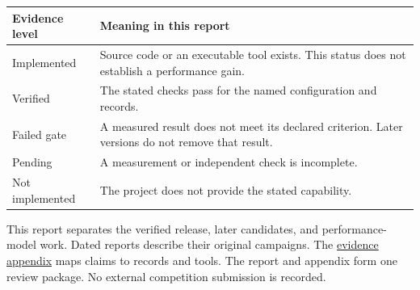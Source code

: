 \documentclass[10pt,a4paper]{article}
\begin{document}
\begin{longtable}[]{@{}ll@{}}
\toprule
\begin{minipage}[b]{0.47\columnwidth}\raggedright
Evidence level\strut
\end{minipage} & \begin{minipage}[b]{0.47\columnwidth}\raggedright
Meaning in this report\strut
\end{minipage}\tabularnewline
\midrule
\endhead
\begin{minipage}[t]{0.47\columnwidth}\raggedright
Implemented\strut
\end{minipage} & \begin{minipage}[t]{0.47\columnwidth}\raggedright
Source code or an executable tool exists. This status does not establish
a performance gain.\strut
\end{minipage}\tabularnewline
\begin{minipage}[t]{0.47\columnwidth}\raggedright
Verified\strut
\end{minipage} & \begin{minipage}[t]{0.47\columnwidth}\raggedright
The stated checks pass for the named configuration and records.\strut
\end{minipage}\tabularnewline
\begin{minipage}[t]{0.47\columnwidth}\raggedright
Failed gate\strut
\end{minipage} & \begin{minipage}[t]{0.47\columnwidth}\raggedright
A measured result does not meet its declared criterion. Later versions
do not remove that result.\strut
\end{minipage}\tabularnewline
\begin{minipage}[t]{0.47\columnwidth}\raggedright
Pending\strut
\end{minipage} & \begin{minipage}[t]{0.47\columnwidth}\raggedright
A measurement or independent check is incomplete.\strut
\end{minipage}\tabularnewline
\begin{minipage}[t]{0.47\columnwidth}\raggedright
Not implemented\strut
\end{minipage} & \begin{minipage}[t]{0.47\columnwidth}\raggedright
The project does not provide the stated capability.\strut
\end{minipage}\tabularnewline
\bottomrule
\end{longtable}

This report separates the verified release, later candidates, and
performance-model work. Dated reports describe their original campaigns.
The
\href{https://github.com/MoyaMryia/riscv-accl/blob/main/spacemit/reports/SUBMISSION-EVIDENCE.md}{evidence
appendix} maps claims to records and tools. The report and appendix form
one review package. No external competition submission is recorded.
\end{document}
